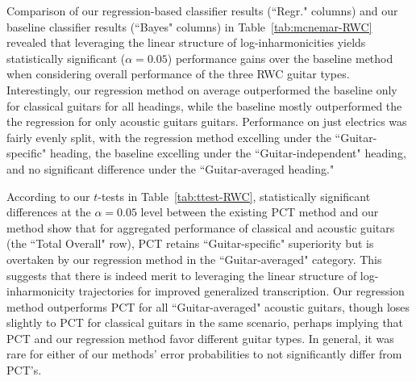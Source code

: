 \documentclass[12pt]{cmuthesis}
\begin{document}
Comparison of our regression-based classifier results (``Regr." columns) and our baseline classifier results (``Bayes" columns) in Table~\ref{tab:mcnemar-RWC} revealed that leveraging the linear structure of log-inharmonicities yields statistically significant ($\alpha = 0.05$) performance gains over the baseline method when considering overall performance of the three RWC guitar types. Interestingly, our regression method on average outperformed the baseline only for classical guitars for all headings, while the baseline mostly outperformed the the regression for only acoustic guitars guitars. Performance on just electrics was fairly evenly split, with the regression method excelling under the ``Guitar-specific" heading, the baseline excelling under the ``Guitar-independent" heading, and no significant difference under the ``Guitar-averaged heading."

According to our $t$-tests in Table~\ref{tab:ttest-RWC}, statistically significant differences at the $\alpha = 0.05$ level between the existing PCT method and our method show that for aggregated performance of classical and acoustic guitars (the ``Total Overall" row), PCT retains ``Guitar-specific" superiority but is overtaken by our regression method in the ``Guitar-averaged" category. This suggests that there is indeed merit to leveraging the linear structure of log-inharmonicity trajectories for improved generalized transcription. Our regression method outperforms PCT for all ``Guitar-averaged" acoustic guitars, though loses slightly to PCT for classical guitars in the same scenario, perhaps implying that PCT and our regression method favor different guitar types. In general, it was rare for either of our methods' error probabilities to not significantly differ from PCT's.
\end{document}
